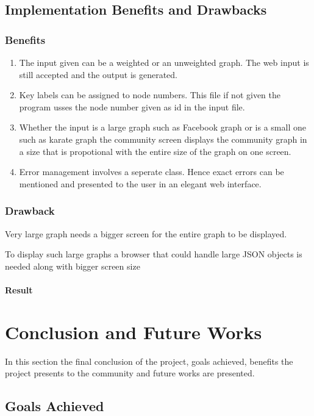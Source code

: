 \section{Implementation Benefits and Drawbacks}
\subsection{Benefits}
\begin{enumerate}
\item The input given can be a weighted or an unweighted graph. The web input is still accepted and the output is generated.
\item Key labels can be assigned to node numbers.  This file if not given the program usses the node number given as id in the input file. 
\item Whether the input is a large graph such as Facebook graph or is a small one such as karate graph the community screen displays the community graph in a size that is propotional with the entire size of the graph on one screen. 
\item Error management involves a seperate class. Hence exact errors can be mentioned and presented to the user in an elegant web interface.
\end{enumerate}
\subsection{Drawback}
\item Very large graph needs a bigger screen for the entire graph to be displayed.
\item To display such large graphs a browser that could handle large JSON objects is needed along with bigger screen size

\subsubsection{Result}

\chapter{Conclusion and Future Works}
In this section the final conclusion of the project, goals achieved, benefits the project presents to the community and future works are presented. 

\section{Goals Achieved}

